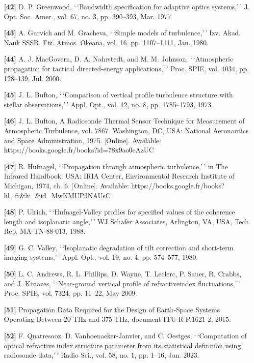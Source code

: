 \documentclass[
]{article}
\begin{document}
\textbf{{[}42{]}} D. P. Greenwood, `\,`Bandwidth specification for
adaptive optics systems,'\,' J. Opt. Soc. Amer., vol. 67, no. 3, pp.
390--393, Mar. 1977.

\textbf{{[}43{]}} A. Gurvich and M. Gracheva, `\,`Simple models of
turbulence,'\,' Izv. Akad. Nauk SSSR, Fiz. Atmos. Okeana, vol. 16, pp.
1107--1111, Jan. 1980.

\textbf{{[}44{]}} A. J. MacGovern, D. A. Nahrstedt, and M. M. Johnson,
`\,`Atmospheric propagation for tactical directed-energy
applications,'\,' Proc. SPIE, vol. 4034, pp. 128--139, Jul. 2000.

\textbf{{[}45{]}} J. L. Bufton, `\,`Comparison of vertical profile
turbulence structure with stellar observations,'\,' Appl. Opt., vol. 12,
no. 8, pp. 1785--1793, 1973.

\textbf{{[}46{]}} J. L. Bufton, A Radiosonde Thermal Sensor Technique
for Measurement of Atmospheric Turbulence, vol. 7867. Washington, DC,
USA: National Aeronautics and Space Administration, 1975. {[}Online{]}.
Available: https://books.google.fr/books?id=78x9ao0cAzUC

\textbf{{[}47{]}} R. Hufnagel, `\,`Propagation through atmospheric
turbulence,'\,' in The Infrared Handbook. USA: IRIA Center,
Environmental Research Institute of Michigan, 1974, ch. 6. {[}Online{]}.
Available: https://books.google.fr/books?hl=fr\&lr=\&id=MwKMUP3NAUsC

\textbf{{[}48{]}} P. Ulrich, `\,`Hufnagel-Valley profiles for specified
values of the coherence length and isoplanatic angle,'\,' WJ Schafer
Associates, Arlington, VA, USA, Tech. Rep. MA-TN-88-013, 1988.

\textbf{{[}49{]}} G. C. Valley, `\,`Isoplanatic degradation of tilt
correction and short-term imaging systems,'\,' Appl. Opt., vol. 19, no.
4, pp. 574--577, 1980.

\textbf{{[}50{]}} L. C. Andrews, R. L. Phillips, D. Wayne, T. Leclerc,
P. Sauer, R. Crabbs, and J. Kiriazes, `\,`Near-ground vertical profile
of refractiveindex fluctuations,'\,' Proc. SPIE, vol. 7324, pp. 11--22,
May 2009.

\textbf{{[}51{]}} Propagation Data Required for the Design of
Earth-Space Systems Operating Between 20 THz and 375 THz, document ITU-R
P.1621-2, 2015.

\textbf{{[}52{]}} F. Quatresooz, D. Vanhoenacker-Janvier, and C.
Oestges, `\,`Computation of optical refractive index structure parameter
from its statistical definition using radiosonde data,'\,' Radio Sci.,
vol. 58, no. 1, pp. 1--16, Jan. 2023.
\end{document}
